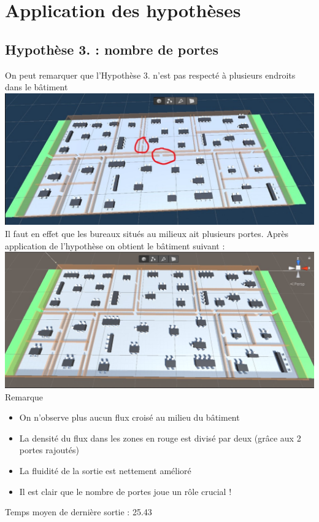 \documentclass[12pt]{article}
\begin{document}
\section{Application des hypothèses}
\subsection{Hypothèse 3. : nombre de portes}
On peut remarquer que l'Hypothèse 3. n'est pas respecté à plusieurs endroits dans le bâtiment
\newline
\includegraphics[scale=0.5]{Batiment problème 3..jpg}
\newline
Il faut en effet que les bureaux situés au milieux ait plusieurs portes.
\newline\newline
Après application de l'hypothèse on obtient le bâtiment suivant :
\newline
\includegraphics[scale=0.5]{Batiment Hypothèse 3..jpg}
\newline\newline
Remarque
\begin{itemize}
    \item On n'observe plus aucun flux croisé au milieu du bâtiment
    \item La densité du flux dans les zones en rouge est divisé par deux (grâce aux 2 portes rajoutés)
    \item La fluidité de la sortie est nettement amélioré
    \item Il est clair que le nombre de portes joue un rôle crucial ! 
\end{itemize}
Temps moyen de dernière sortie : 25.43
\end{document}
